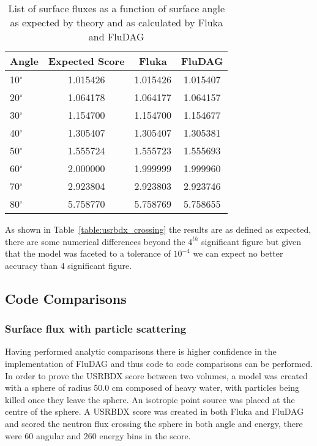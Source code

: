 \documentclass{anstrans}[12pt]
\begin{document}
\begin{table}%
        \begin{center}
                \begin{tabular}{|l|c|c|c|}
                  \hline
                        Angle & Expected Score & Fluka  & FluDAG \\
                        \hline
                        10$^{\circ}$ & 1.015426 & 1.015426 & 1.015407\\
                        20$^{\circ}$ & 1.064178 & 1.064177 & 1.064157\\
                        30$^{\circ}$ & 1.154700 & 1.154700 & 1.154677\\
                        40$^{\circ}$ & 1.305407 & 1.305407 & 1.305381\\
                        50$^{\circ}$ & 1.555724 & 1.555723 & 1.555693\\
                        60$^{\circ}$ & 2.000000 & 1.999999 & 1.999960\\
                        70$^{\circ}$ & 2.923804 & 2.923803 & 2.923746\\
                        80$^{\circ}$ & 5.758770 & 5.758769 & 5.758655\\
                        \hline
                \end{tabular}
                \caption{List of surface fluxes as a function of surface
                         angle as expected by theory and as calculated by 
                         Fluka and FluDAG}
                \label{usrbdx_crossing}
                \end{center}
\end{table}

As shown in Table~\ref{table:usrbdx_crossing} the results are as defined as expected, 
there are some numerical differences beyond the $4^{th}$ significant figure but given that the model
was faceted to a tolerance of $10^{-4}$ we can expect no better accuracy 
than 4 significant figure.

\subsection{Code Comparisons}
\subsubsection*{Surface flux with particle scattering}
Having performed analytic comparisons there is higher confidence in
the implementation of FluDAG and thus code to code comparisons can be
performed. In order to prove the USRBDX score between two volumes, a
model was created with a sphere of radius 50.0 cm composed of heavy
water, with particles being killed once they leave the sphere. An
isotropic point source was placed at the centre of the sphere. A
USRBDX score was created in both Fluka and FluDAG and scored the
neutron flux crossing the sphere in both angle and energy, there were
60 angular and 260 energy bins in the score.
\end{document}
